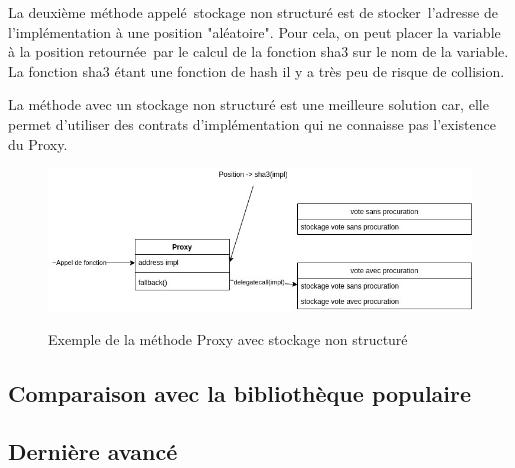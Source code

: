 La deuxième méthode appelé stockage non structuré est de stocker l'adresse de l'implémentation à une position "aléatoire".
Pour cela, on peut placer la variable à la position retournée par le calcul de la fonction sha3 sur le nom de la variable.
La fonction sha3 étant une fonction de hash il y a très peu de risque de collision.

La méthode avec un stockage non structuré est une meilleure solution car, elle permet d'utiliser des contrats d'implémentation 
qui ne connaisse pas l'existence du Proxy.

\begin{figure}[h!]
  \caption{Exemple de la méthode Proxy avec stockage non structuré}
  \includegraphics[scale=0.5]{proxy_unstructured.jpg}
  \centering 
  \label{fig:proxy_structuré}
\end{figure}

\subsection{Comparaison avec la bibliothèque populaire}

\subsection{Dernière avancé}



